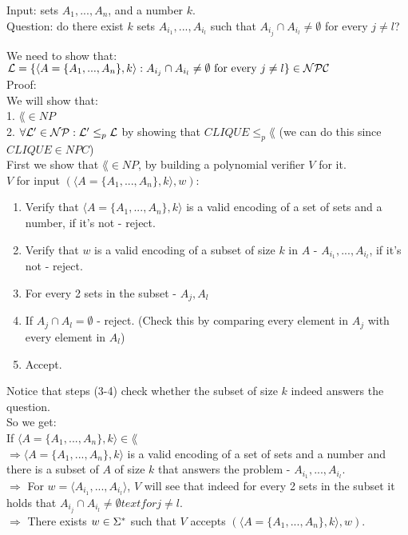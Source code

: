 
Input: sets $A_1, ..., A_n$, and a number $k$. \\
Question: do there exist $k$ sets $A_{i_1} , ..., A_{i_l}$ such that $A_{i_j} \cap A_{i_l} \neq \emptyset$ for
every $j \neq l$?

We need to show that: \\
$\mathcal{L} = \{\langle A = \{A_1, ..., A_n\}, k \rangle:  A_{i_j} \cap A_{i_l} \neq \emptyset \text{ for
        every } j \neq l\} \in \mathcal{N}\mathcal{P}\mathcal{C}$ \\

Proof: \\
We will show that: \\
1. $\lang \in NP$ \\
2. $\forall \mathcal{L}' \in \mathcal{N}\mathcal{P}: \mathcal{L}' \leq_p \mathcal{L}$ by showing that $CLIQUE \leq_p \lang$ (we can do this since $CLIQUE \in NPC$) \\

First we show that $\lang \in NP$, by building a polynomial verifier $V$ for it. \\
$V$ for input $(\langle A = \{A_1, ..., A_n\}, k \rangle, w)$:
\begin{enumerate}[1., itemsep=5pt]
    \item Verify that $\langle A = \{A_1, ..., A_n\}, k \rangle$ is a valid encoding of a set of sets and a number, if it's not - reject.
    \item Verify that $w$ is a valid encoding of a subset of size $k$ in $A$ - $A_{i_1} , ..., A_{i_l}$, if it's not - reject.

    \item For every 2 sets in the subset - $A_j, A_l$
    \item \qquad If $A_j \cap A_l = \emptyset$ - reject. (Check this by comparing every element in $A_j$ with every element in $A_l$)

    \item Accept.

\end{enumerate}

Notice that steps (3-4) check whether the subset of size $k$ indeed answers the question. \\

So we get: \\
If $\langle A = \{A_1, ..., A_n\}, k \rangle \in \lang$ \\
$\Rightarrow \langle A = \{A_1, ..., A_n\}, k \rangle$ is a valid encoding of a set of sets and a number
and there is a subset of $A$ of size $k$ that answers the problem - $A_{i_1} , ..., A_{i_l}$.\\
$\Rightarrow $ For $w=\langle A_{i_1} , ..., A_{i_l} \rangle$, $V$ will see that indeed for every 2 sets in the
subset it holds that $A_{i_j} \cap A_{i_l} \neq \emptyset text{ for } j \neq l$. \\
$\Rightarrow $ There exists $w \in \Sigma^*$ such that $V$ accepts $(\langle A = \{A_1, ..., A_n\}, k \rangle, w)$. \\

